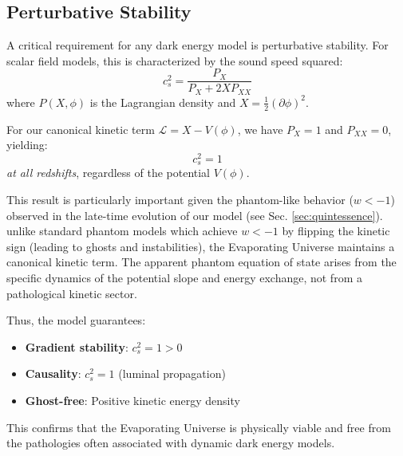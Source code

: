 

\subsection{Perturbative Stability}
\label{sec:stability}

A critical requirement for any dark energy model is perturbative stability.
For scalar field models, this is characterized by the sound speed squared:
%
\begin{equation}
c_s^2 = \frac{P_X}{P_X + 2X P_{XX}}
\end{equation}
%
where $P(X,\phi)$ is the Lagrangian density and $X = \frac{1}{2}(\partial\phi)^2$.

For our canonical kinetic term $\mathcal{L} = X - V(\phi)$, we have $P_X = 1$ 
and $P_{XX} = 0$, yielding:
%
\begin{equation}
c_s^2 = 1
\end{equation}
%
\textit{at all redshifts}, regardless of the potential $V(\phi)$.

This result is particularly important given the phantom-like behavior ($w < -1$) observed 
in the late-time evolution of our model (see Sec. \ref{sec:quintessence}). unlike standard phantom models 
which achieve $w < -1$ by flipping the kinetic sign (leading to ghosts and instabilities), 
the Evaporating Universe maintains a canonical kinetic term. The apparent phantom equation of state 
arises from the specific dynamics of the potential slope and energy exchange, not from a 
pathological kinetic sector.

Thus, the model guarantees:
\begin{itemize}
    \item \textbf{Gradient stability}: $c_s^2 = 1 > 0$
    \item \textbf{Causality}: $c_s^2 = 1$ (luminal propagation)
    \item \textbf{Ghost-free}: Positive kinetic energy density
\end{itemize}
This confirms that the Evaporating Universe is physically viable and free from the pathologies 
often associated with dynamic dark energy models.
